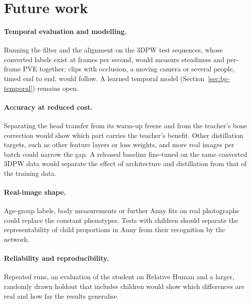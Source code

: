 \section{Future work}
\label{sec:future}

\paragraph{Temporal evaluation and modelling.}
Running the filter and the alignment on the 3DPW test sequences, whose converted labels exist at \DataLabelFps{}
frames per second, would measure steadiness and per-frame PVE together; clips with occlusion, a moving camera or
several people, timed end to end, would follow. A learned temporal model (Section~\ref{sec:bg-temporal}) remains
open.

\paragraph{Accuracy at reduced cost.}
Separating the head transfer from its warm-up freeze and from the teacher's bone correction would show which part
carries the teacher's benefit. Other distillation targets, such as other feature layers or loss weights, and more
real images per batch could narrow the gap. A released baseline fine-tuned on the same
converted 3DPW data would separate the effect of architecture and distillation from that of the training data.

\paragraph{Real-image shape.}
Age-group labels, body measurements or further Anny fits on real photographs could replace the constant phenotypes.
Tests with children should separate the representability of child proportions in Anny from their recognition by
the network.

\paragraph{Reliability and reproducibility.}
Repeated runs, an evaluation of the student on Relative Human and a larger, randomly drawn holdout that includes
children would show which differences are real and how far the results generalise.
